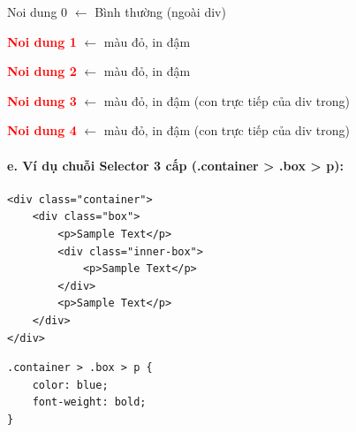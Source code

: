 \documentclass[11pt,oneside]{book}
\begin{document}
\begin{browserWindow}
\sffamily\small
\textcolor{darkText}{Noi dung 0} {\small\textcolor{gray!60}{$\leftarrow$ Bình thường (ngoài div)}} \par\vspace{4pt}
\begin{tcolorbox}[arc=2pt, colback=primaryBlue!5, colframe=primaryBlue!40, boxrule=1pt, title={\sffamily\small\color{white}\textbf{div ngoài}}, colbacktitle=primaryBlue!70]
\textcolor{red}{\textbf{Noi dung 1}} {\small\textcolor{gray!60}{$\leftarrow$ màu đỏ, in đậm}} \par\vspace{2pt}
\textcolor{red}{\textbf{Noi dung 2}} {\small\textcolor{gray!60}{$\leftarrow$ màu đỏ, in đậm}} \par\vspace{3pt}
\begin{tcolorbox}[arc=2pt, colback=white, colframe=accentOrange!50, boxrule=1pt, title={\sffamily\scriptsize\color{white}\textbf{div trong}}, colbacktitle=accentOrange!80]
\textcolor{red}{\textbf{Noi dung 3}} {\small\textcolor{gray!60}{$\leftarrow$ màu đỏ, in đậm (con trực tiếp của div trong)}} \par\vspace{2pt}
\textcolor{red}{\textbf{Noi dung 4}} {\small\textcolor{gray!60}{$\leftarrow$ màu đỏ, in đậm (con trực tiếp của div trong)}}
\end{tcolorbox}\vspace{3pt}
\end{tcolorbox}
\end{browserWindow}

\paragraph{e. Ví dụ chuỗi Selector 3 cấp (.container > .box > p):}

\begin{codeWindow}
\begin{lstlisting}[language=HTML5]
<div class="container">
    <div class="box">
        <p>Sample Text</p>
        <div class="inner-box">
            <p>Sample Text</p>
        </div>
        <p>Sample Text</p>
    </div>
</div>
\end{lstlisting}

\begin{lstlisting}[language=CSS3]
.container > .box > p {
    color: blue;
    font-weight: bold;
}
\end{lstlisting}
\end{codeWindow}
\end{document}
